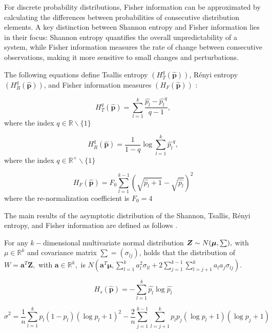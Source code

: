 For discrete probability distributions, Fisher information can be approximated by calculating the differences between probabilities of consecutive distribution elements. A key distinction between Shannon entropy and Fisher information lies in their focus: Shannon entropy quantifies the overall unpredictability of a system, while Fisher information measures the rate of change between consecutive observations, making it more sensitive to small changes and perturbations.

The following equations define Tsallis entropy $	(H_{T}^{q}(\widehat{\bm{p}}))$, Rényi entropy $(H_{R}^{q}(\widehat{\bm{p}}))$, and Fisher information measures $(H_{F}(\widehat{\bm{p}}))$ \cite{sanchez2009discrete} :

\begin{equation}
	H_{T}^{q}(\widehat{\bm{p}})=\sum_{l=1}^{k}\dfrac{\widehat{p_l}-\widehat{p_l}^q}{q-1},
\end{equation}
where the index $q\in \mathbb{R}\backslash \{1\}$

\begin{equation}
	H_{R}^{q}(\widehat{\bm{p}})=\dfrac{1}{1-q} \log \sum_{l=1}^{k}{\widehat{p_l}}^q,
\end{equation}
where the index $q\in \mathbb{R}^{+}\backslash \{1\}$

\begin{equation}
	H_F(\widehat{\bm{p}})=F_0\sum_{l=1}^{k-1}(\sqrt{\widehat{p_l}+1}-\sqrt{\widehat{p_l}})^2
\end{equation}
where the re-normalization coefficient is $F_0=4$ \cite{sanchez2009discrete}

The main results of the asymptotic distribution of the Shannon, Tsallis, Rényi entropy, and Fisher information are defined as follows \cite{Rey2023}. 

For any $k-$dimensional multivariate normal distribution $\bm{Z}\sim \normalsize N(\bm{\mu},\sum),$ with $\mu \in \mathbb{R}^k$ and covariance matrix $\sum=(\sigma_{lj})$, holds that the distribution of $W=\bm{a}^T\bm{Z},$ with $\bm{a} \in \mathbb{R}^k,$ is $N(\bm{a}^T\bm{\mu},\sum_{l=1}^{k}a_l^2 \sigma_{ll}+2\sum_{j=1}^{k-1}\sum_{l=j+1}^{k} a_la_j\sigma_{lj})$. 

\begin{equation}
	H_s(\widehat{\bm{p}})=-\sum_{l=1}^{k}\widehat{p_l}\log\widehat{p_l}
\end{equation}

\begin{equation}
	\widehat{\sigma}^2=\dfrac{1}{n}\sum_{l=1}^{k}p_l(1-p_l)(\log p_l+1)^2-\dfrac{2}{n}\sum_{j=1}^{k-1}\sum_{l=j+1}^{k}p_lp_j(\log p_l+1)(\log p_j+1)
\end{equation}
	   
 

